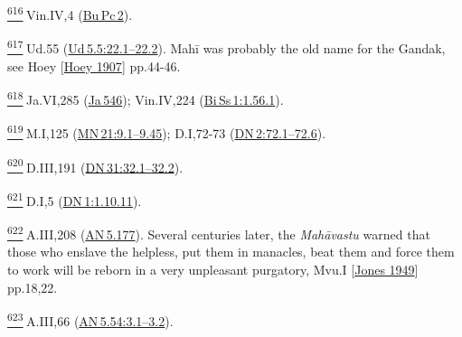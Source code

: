 \label{footprints_split_025.html_fn616}
\hyperref[footprints_split_015.htmlux5cux23fnref616]{\textsuperscript{616}} Vin.IV,4
(\href{https://suttacentral.net/pli-tv-bu-vb-pc2/en/brahmali}{Bu\,Pc\,2}).

\label{footprints_split_025.html_fn617}
\hyperref[footprints_split_015.htmlux5cux23fnref617]{\textsuperscript{617}} Ud.55
(\href{https://suttacentral.net/ud5.5/en/sujato\#22.1}{Ud\,5.5:22.1--22.2}).
Mahī was probably the old name for the Gandak, see {Hoey
{{[}\hyperref[footprints_split_022.htmlux5cux23Hoeyux5cux25201907]{Hoey
1907}{]}}} pp.44-46.

\label{footprints_split_025.html_fn618}
\hyperref[footprints_split_015.htmlux5cux23fnref618]{\textsuperscript{618}} Ja.VI,285
(\href{https://suttacentral.net/ja546}{Ja\,546}); Vin.IV,224
(\href{https://suttacentral.net/pli-tv-bi-vb-ss1/en/brahmali\#1.56.1}{Bi\,Ss\,1:1.56.1}).

\label{footprints_split_025.html_fn619}
\hyperref[footprints_split_015.htmlux5cux23fnref619]{\textsuperscript{619}} M.I,125
(\href{https://suttacentral.net/mn21/en/sujato\#9.1}{MN\,21:9.1--9.45});
D.I,72-73
(\href{https://suttacentral.net/dn2/en/sujato\#72.1}{DN\,2:72.1--72.6}).

\label{footprints_split_025.html_fn620}
\hyperref[footprints_split_015.htmlux5cux23fnref620]{\textsuperscript{620}} D.III,191
(\href{https://suttacentral.net/dn31/en/sujato\#32.1}{DN\,31:32.1--32.2}).

\label{footprints_split_025.html_fn621}
\hyperref[footprints_split_015.htmlux5cux23fnref621]{\textsuperscript{621}} D.I,5
(\href{https://suttacentral.net/dn1/en/sujato\#1.10.11}{DN\,1:1.10.11}).

\label{footprints_split_025.html_fn622}
\hyperref[footprints_split_015.htmlux5cux23fnref622]{\textsuperscript{622}} A.III,208
(\href{https://suttacentral.net/an5.177/en/sujato}{AN\,5.177}). Several
centuries later, the \emph{Mahāvastu} warned that those who enslave the
helpless, put them in manacles, beat them and force them to work will be
reborn in a very unpleasant purgatory, {Mvu.I
{{[}\hyperref[footprints_split_023.htmlux5cux23Jonesux5cux25201949]{Jones
1949}{]}}} pp.18,22.

\label{footprints_split_025.html_fn623}
\hyperref[footprints_split_015.htmlux5cux23fnref623]{\textsuperscript{623}} A.III,66
(\href{https://suttacentral.net/an5.54/en/sujato\#3.1}{AN\,5.54:3.1--3.2}).

